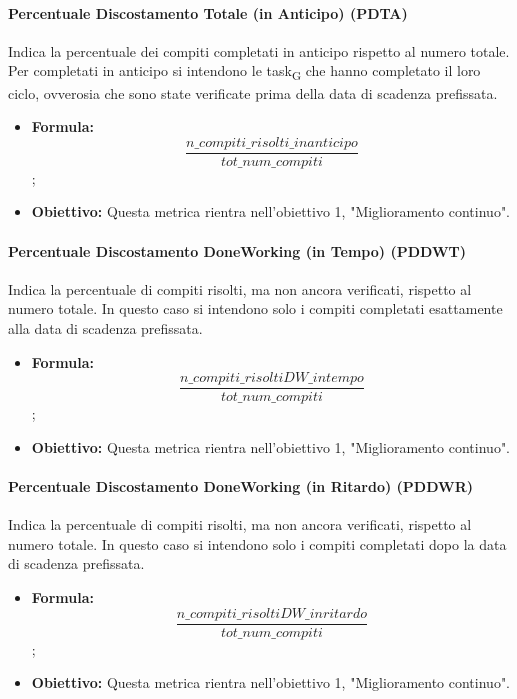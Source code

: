 	\paragraph{Percentuale Discostamento Totale (in Anticipo) (PDTA)}
	Indica la percentuale dei compiti completati in anticipo rispetto al numero totale. Per completati in anticipo si intendono le task\textsubscript{G} che hanno completato il loro ciclo, ovverosia che sono state verificate prima della data di scadenza prefissata.
	\begin{itemize}
		\item \textbf{Formula:}\[\frac{n\_compiti\_risolti\_inanticipo}{tot\_num\_compiti}\];
		\item \textbf{Obiettivo:} Questa metrica rientra nell'obiettivo 1, "Miglioramento continuo".
	\end{itemize}
	
	\paragraph{Percentuale Discostamento DoneWorking (in Tempo) (PDDWT)}
	Indica la percentuale di compiti risolti, ma non ancora verificati, rispetto al numero totale. In questo caso si intendono solo i compiti completati esattamente alla data di scadenza prefissata.
	\begin{itemize}
		\item \textbf{Formula:}\[\frac{n\_compiti\_risoltiDW\_intempo}{tot\_num\_compiti}\];
		\item \textbf{Obiettivo:} Questa metrica rientra nell'obiettivo 1, "Miglioramento continuo".
	\end{itemize}
	
	\paragraph{Percentuale Discostamento DoneWorking (in Ritardo) (PDDWR)}
	Indica la percentuale di compiti risolti, ma non ancora verificati, rispetto al numero totale. In questo caso si intendono solo i compiti completati dopo la data di scadenza prefissata.
	\begin{itemize}
		\item \textbf{Formula:}\[\frac{n\_compiti\_risoltiDW\_inritardo}{tot\_num\_compiti}\];
		\item \textbf{Obiettivo:} Questa metrica rientra nell'obiettivo 1, "Miglioramento continuo".
	\end{itemize}
	

